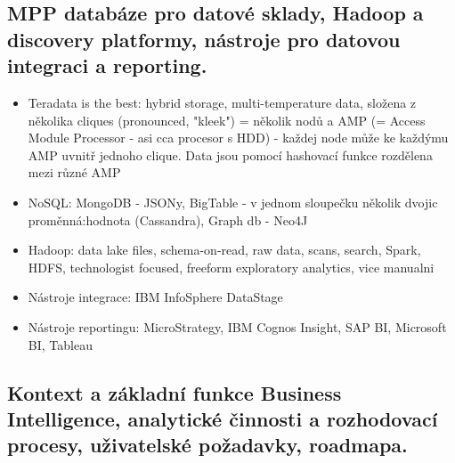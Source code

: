 \documentclass[a4paper,hidelinks]{article}
\begin{document}
\subsection{MPP databáze pro datové sklady, Hadoop a discovery platformy, nástroje pro datovou integraci a reporting.}

\begin{itemize}
    \item Teradata is the best: hybrid storage, multi-temperature data, složena z několika cliques (pronounced, "kleek") = několik nodů a AMP (= Access Module Processor - asi cca procesor s HDD) - každej node může ke každýmu AMP uvnitř jednoho clique. Data jsou pomocí hashovací funkce rozdělena mezi různé AMP
    \item NoSQL: MongoDB - JSONy, BigTable - v jednom sloupečku několik dvojic proměnná:hodnota (Cassandra), Graph db - Neo4J
    \item Hadoop: data lake files, schema-on-read, raw data, scans, search, Spark, HDFS, technologist focused, freeform exploratory analytics, vice manualni
    \item Nástroje integrace: IBM InfoSphere DataStage
    \item Nástroje reportingu: MicroStrategy, IBM Cognos Insight, SAP BI, Microsoft BI, Tableau
\end{itemize}

\subsection{Kontext a základní funkce Business Intelligence, analytické činnosti a rozhodovací procesy, uživatelské požadavky, roadmapa.}
\end{document}
